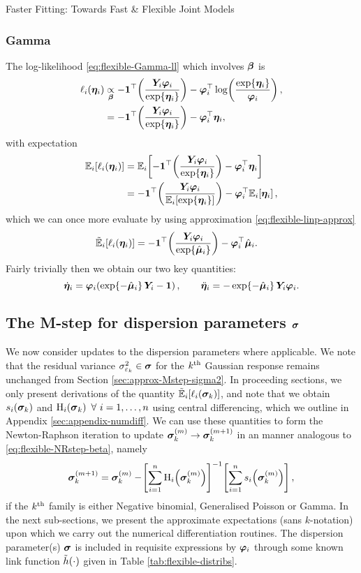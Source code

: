 \begin{chapter}{\label{cha:flexible}Faster Fitting: Towards Fast \& Flexible Joint Models}
\subsubsection{Gamma}
The log-likelihood \eqref{eq:flexible-Gamma-ll} which involves $\bm{\beta}$ is 
\begin{align*}
    \ell_i\!\left(\bm{\eta}_i\right)&\underset{\bm{\beta}}{\propto}-\bm{1}^\top\!\left(\frac{\bm{Y}_i\bm{\varphi}_i}{\exp\!\left\{\bm{\eta}_i\right\}}\right)-\bm{\varphi}_i^\top\log\!\left(\frac{\exp\!\left\{\bm{\eta}_i\right\}}{\bm{\varphi}_i}\right),\\
    &=-\bm{1}^\top\!\left(\frac{\bm{Y}_i\bm{\varphi}_i}{\exp\!\left\{\bm{\eta}_i\right\}}\right)-\bm{\varphi}_i^\top\bm{\eta}_i,
\end{align*}
with expectation
\begin{align*}
    \Expi{\elli{\linp}}&=\Expi{-\boneT\lb\frac{\Y\bphi}{\exp\lbr\linp\rbr}\rb-\bphi^\top\linp}\\
    &=-\boneT\lb\frac{\Y\bphi}{\Expi{\exp\lbr\linp\rbr}}\rb-\bphi^\top\Expi{\linp},
\end{align*}
which we can once more evaluate by using approximation \eqref{eq:flexible-linp-approx}
\begin{align*}
    \tilde{\mathbb{E}}_i\!\left[\ell_i\!\left(\bm{\eta}_i\right)\right]&=-\bm{1}^\top\!\left(\frac{\bm{Y}_i\bm{\varphi}_i}{\exp\!\left\{\hat{\bm{\mu}}_i\right\}}\right)-\bm{\varphi}_i^\top\hat{\bm{\mu}}_i.
\end{align*}
Fairly trivially then we obtain our two key quantities:
\begin{equation}
    \dot{\bm{\eta}}_i = \bm{\varphi}_i\!\left(\exp\!\left\{-\hat{\bm{\mu}}_i\right\}\bm{Y}_i-\bm{1}\right),\qquad\ddot{\bm{\eta}}_i=-\exp\!\left\{-\hat{\bm{\mu}}_i\right\}\bm{Y}_i\bm{\varphi}_i.
\label{eq:flexible-Mstep-Gamma}
\end{equation}
\resettocmain
\subsection{The M-step for dispersion parameters \texorpdfstring{$\bm{\sigma}$}{sigma}}\label{sec:flexible-Mstep-disp}
\rmtoc
We now consider updates to the dispersion parameters where applicable. We note that the residual variance $\sigma_{\varepsilon_k}^2\in\bm{\sigma}$ for the $k^{\text{th}}$ Gaussian response remains unchanged from Section \ref{sec:approx-Mstep-sigma2}. In proceeding sections, we only present derivations of the quantity $\tilde{\mathbb{E}}_i\!\left[\ell_i\!\left(\bm{\sigma}_k\right)\right]$, and note that we obtain $s_i(\bm{\sigma}_k)$ and $\mathrm{H}_i\lb\bs{_k}\rb\ \forall\ i=1,\dots,n$ using central differencing, which we outline in Appendix \ref{sec:appendix-numdiff}. We can use these quantities to form the Newton-Raphson iteration to update $\bm{\sigma}_k^{(m)}\rightarrow\bm{\sigma}_k^{(m+1)}$ in an manner analogous to \eqref{eq:flexible-NRstep-beta}, namely
\begin{equation}
    \bm{\sigma}_k^{(m+1)}=\bm{\sigma}_k^{(m)}-\!\left[\sum_{i=1}^n\mathrm{H}_i\!\left(\bm{\sigma}_k^{(m)}\right)\right]^{-1}\!\left[\sum_{i=1}^n s_i\!\left(\bm{\sigma}_k^{(m)}\right)\right],
\label{eq:flexible-NRstep-sigma}
\end{equation}
if the $k^{\text{th}}$ family is either Negative binomial, Generalised Poisson or Gamma. In the next sub-sections, we present the approximate expectations (sans $k$-notation) upon which we carry out the numerical differentiation routines. The dispersion parameter(s) $\bm{\sigma}$ is included in requisite expressions by $\bm{\varphi}_i$ through some known link function $\tilde{h}\!\left(\cdot\right)$ given in Table \ref{tab:flexible-distribs}.

\end{chapter}
